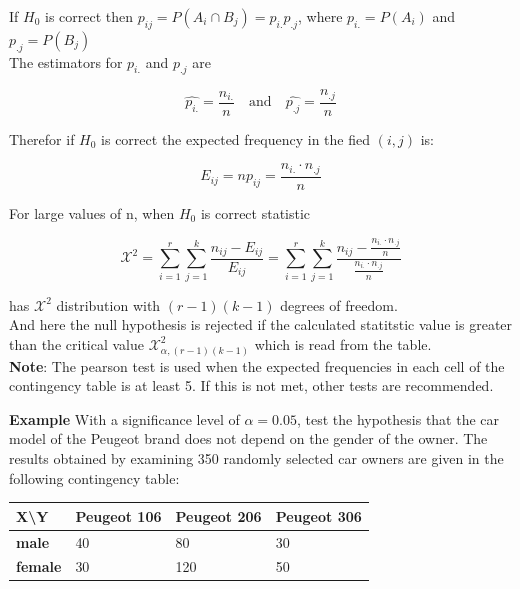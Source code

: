 \documentclass[a4paper, 12pt]{article}
\begin{document}
If $H_0$ is correct then $p_{ij} = P(A_i \cap B_j)=p_{i.}p_{.j}$, where $p_{i.}=P(A_i)$ and $p_{.j}=P(B_j)$\\

The estimators for $p_{i.}$ and $p_{.j}$ are

\[ \hat{p_{i.}} = \frac{n_{i.}}{n} \quad \text{and} \quad \hat{p_{.j}} = \frac{n_{.j}}{n} \]

Therefor if $H_0$ is correct the expected frequency in the fied $(i,j)$ is:

\[ E_{ij} = np_{ij} = \frac{n_{i.} \cdot n_{.j}}{n} \]

For large values of n, when $H_0$ is correct statistic

\[ \mathcal{X}^2 = \sum_{i=1}^{r}\sum_{j=1}^{k} \frac{n_{ij}-E_{ij}}{E_{ij}} 
= \sum_{i=1}^{r}\sum_{j=1}^{k} \frac{n_{ij}-\frac{n_{i.} \cdot n_{.j}}{n}}{\frac{n_{i.} \cdot n_{.j}}{n}} \]

has $\mathcal{X}^2$ distribution with $(r-1)(k-1)$ degrees of freedom.\\

And here the null hypothesis is rejected if the calculated statitstic value is greater than the critical value $\mathcal{X}^2_{\alpha, (r-1)(k-1)}$ which is read from the table.\\

\textbf{Note}: The pearson test is used when the expected frequencies in each cell of the contingency table is at least 5. If this is not met, other tests are recommended.

\newpage

\textbf{Example} With a significance level of $\alpha = 0.05$, test the hypothesis that the car
model of the Peugeot brand does not depend on the gender of the
owner. The results obtained by examining 350 randomly selected car
owners are given in the following contingency table:

\begin{table}[h!]
\centering
\begin{tabular}{|l|l|l|l|}
\hline
\textbf{X\textbackslash{}Y} & \textbf{Peugeot 106} & \textbf{Peugeot 206} & \textbf{Peugeot 306} \\ \hline
\textbf{male}               & 40                   & 80                   & 30                   \\ \hline
\textbf{female}             & 30                   & 120                  & 50                   \\ \hline
\end{tabular}
\end{table}
\end{document}
